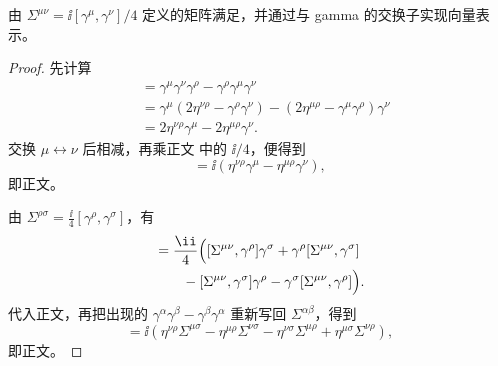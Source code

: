 \begin{proposition}
由 $\Sigma^{\mu\nu}=\ii[\gamma^\mu,\gamma^\nu]/4$ 定义的矩阵满足，并通过与 gamma 的交换子实现向量表示。
\end{proposition}
\begin{proof}
先计算
\begin{align*}
 [\gamma^\mu\gamma^\nu,\gamma^\rho]
 &=\gamma^\mu\gamma^\nu\gamma^\rho
 -\gamma^\rho\gamma^\mu\gamma^\nu\\
 &=\gamma^\mu(2\eta^{\nu\rho}-\gamma^\rho\gamma^\nu)
 -(2\eta^{\mu\rho}-\gamma^\mu\gamma^\rho)\gamma^\nu\\
 &=2\eta^{\nu\rho}\gamma^\mu-2\eta^{\mu\rho}\gamma^\nu.
\end{align*}
交换 $\mu\leftrightarrow\nu$ 后相减，再乘正文 中的 $\ii/4$，便得到
\begin{equation*}
 [\Sigma^{\mu\nu},\gamma^\rho]
 =\ii(\eta^{\nu\rho}\gamma^\mu-\eta^{\mu\rho}\gamma^\nu),
\end{equation*}
即正文。

由 $\Sigma^{\rho\sigma}=\frac{\ii}{4}[\gamma^\rho,\gamma^\sigma]$，有
\begin{align*}
 [\Sigma^{\mu\nu},\Sigma^{\rho\sigma}]
 &=\frac{\ii}{4}\Bigl(
 [\Sigma^{\mu\nu},\gamma^\rho]\gamma^\sigma
 +\gamma^\rho[\Sigma^{\mu\nu},\gamma^\sigma]\\
 &\qquad-[\Sigma^{\mu\nu},\gamma^\sigma]\gamma^\rho
 -\gamma^\sigma[\Sigma^{\mu\nu},\gamma^\rho]\Bigr).
\end{align*}
代入正文，再把出现的 $\gamma^\alpha\gamma^\beta-\gamma^\beta\gamma^\alpha$ 重新写回 $\Sigma^{\alpha\beta}$，得到
\begin{equation*}
 [\Sigma^{\mu\nu},\Sigma^{\rho\sigma}]
 =\ii\left(
 \eta^{\nu\rho}\Sigma^{\mu\sigma}
 -\eta^{\mu\rho}\Sigma^{\nu\sigma}
 -\eta^{\nu\sigma}\Sigma^{\mu\rho}
 +\eta^{\mu\sigma}\Sigma^{\nu\rho}
 \right),
\end{equation*}
即正文。
\end{proof}

